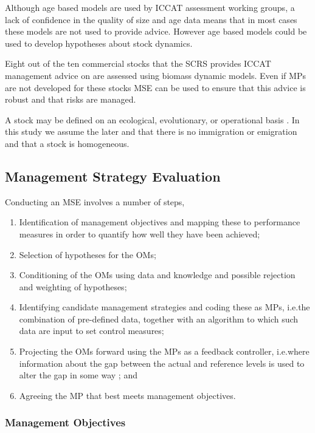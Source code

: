 \documentclass[%
nonumbib,      %
%
]{nrc1}                          %
\begin{document}
Although age based models are used by ICCAT assessment working groups, a lack of confidence in the quality of size and age data \citep{fromentin2014spectre} means that in most cases these models are not used to provide advice. However age based models could be used to develop hypotheses about stock dynamics. 

Eight out of the ten commercial stocks that the SCRS provides ICCAT management advice on are assessed using biomass dynamic models. Even if MPs are not developed for these stocks MSE can be used to ensure that this advice is robust and that risks are managed.

A stock may be defined on an ecological, evolutionary, or operational basis \citep{waples2006invited}. In this study we assume the later and that there is no immigration or emigration and that a stock is homogeneous.

\subsection*{Management Strategy Evaluation}

Conducting an MSE involves a number of steps, \cite[i.e. after][]{punt2007developing}

\begin{enumerate}
 \item Identification of management objectives and mapping these to performance measures in order to quantify how well they have been achieved;
 \item Selection of hypotheses for the OMs;
 \item Conditioning of the OMs using data and knowledge and possible rejection and weighting of hypotheses;
 \item Identifying candidate management strategies and coding these as MPs, i.e.the combination of pre-defined data, together with an algorithm to which such data are input to set control measures;
 \item Projecting the OMs forward using the MPs as a feedback controller, i.e.where information about the gap between the actual and reference levels is used to alter the gap in some way \citep{ramaprasad1983definition}; and
 \item Agreeing the MP that best meets management objectives.
\end{enumerate}

\subsubsection*{Management Objectives} 
\end{document}

